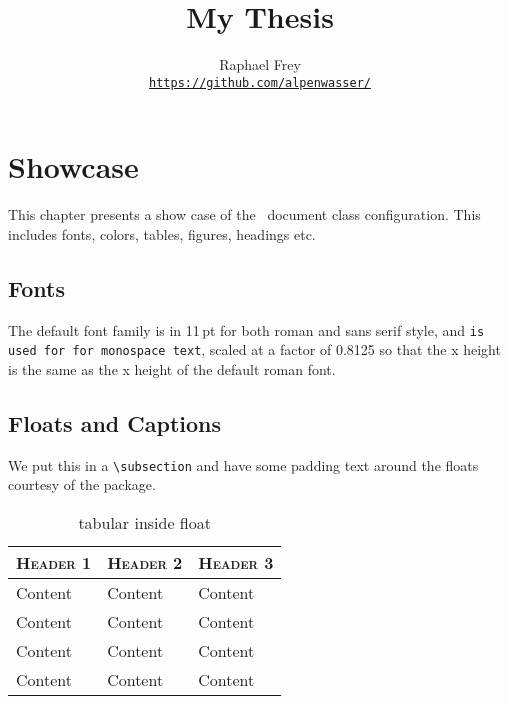 \documentclass[a4paper,11pt,oneside,showtrims]{alpenthesis}
\title{My Thesis}
\author{Raphael Frey \\[1ex]\href{https://github.com/alpenwasser/}
                                 {\nolinkurl{https://github.com/alpenwasser/}}}
\begin{document}
\begin{titlingpage}
    \maketitle
\end{titlingpage}
\frontmatter
\tableofcontents*

\mainmatter
\chapter{Showcase}

This chapter presents a show case of the \athes\ document class configuration.
This includes fonts, colors, tables, figures, headings etc.

\section{Fonts}

The default  font family  is   in 11\,pt  for both  roman and
\textsf{sans serif  style}, and   \texttt{is  used for
for monospace text}, scaled at a factor of  0.8125 so that the x height is the
same as the x height of the default roman font.

\section{Floats and Captions}

We put  this in  a \verb|\subsection|  and have some  padding text  around the
floats courtesy of the  package.

\begin{table}
    \centering
    \caption{tabular inside float}
    \label{tab:float}
    \begin{tabular}{lll}
        \toprule
        \scshape Header 1 & \scshape Header 2 & \scshape Header 3 \\
        \midrule
        Content           & Content           & Content           \\
        Content           & Content           & Content           \\
        Content           & Content           & Content           \\
        Content           & Content           & Content           \\
        \bottomrule
    \end{tabular}
\end{table}
\end{document}
